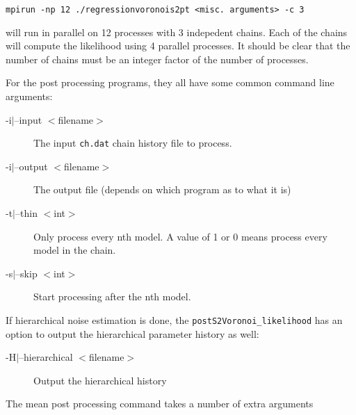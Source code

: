\documentclass[a4paper,12pt]{article}
\begin{document}
\begin{verbatim}
mpirun -np 12 ./regressionvoronois2pt <misc. arguments> -c 3
\end{verbatim}

will run in parallel on 12 processes with 3 indepedent chains. Each of the chains
will compute the likelihood using 4 parallel processes. It should be clear that
the number of chains must be an integer factor of the number of processes.

For the post processing programs, they all have some common command line arguments:

\begin{description}
\item[-i$|$--input $<$filename$>$] The input {\tt ch.dat} chain history file to process.
\item[-i$|$--output $<$filename$>$] The output file (depends on which program as to what it is)
\item[-t$|$--thin $<$int$>$] Only process every nth model. A value of 1 or 0 means process every
  model in the chain.
\item[-s$|$--skip $<$int$>$] Start processing after the nth model.
\end{description}

If hierarchical noise estimation is done, the {\tt postS2Voronoi\_likelihood} has an option
to output the hierarchical parameter history as well:

\begin{description}
\item[-H$|$--hierarchical $<$filename$>$] Output the hierarchical history
\end{description}

The mean post processing command takes a number of extra arguments
\end{document}

